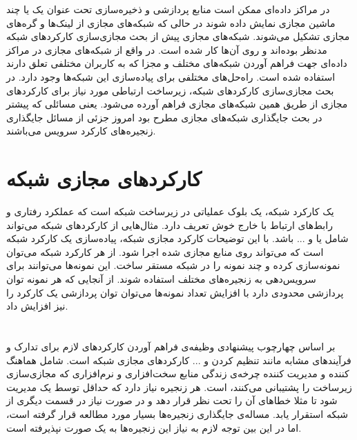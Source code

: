 در مراکز داده‌ای ممکن است منابع پردازشی و ذخیره‌سازی تحت عنوان یک یا چند
ماشین مجازی نمایش داده شوند در حالی که شبکه‌های مجازی از لینک‌ها و گره‌های مجازی تشکیل می‌شوند.
شبکه‌های مجازی پیش از بحث مجازی‌سازی کارکردهای شبکه مدنظر بوده‌اند و روی آن‌ها کار شده است.
در واقع از شبکه‌های مجازی در مراکز داده‌ای جهت فراهم آوردن شبکه‌های مختلف و مجزا که به کاربران مختلفی تعلق دارند
استفاده شده است. راه‌حل‌های مختلفی برای پیاده‌سازی این شبکه‌ها وجود دارد. در بحث مجازی‌سازی کارکردهای شبکه‌، زیرساخت ارتباطی
مورد نیاز 
برای کارکردهای مجازی از طریق همین شبکه‌های مجازی فراهم آورده می‌شود.
یعنی مسائلی که پیشتر در بحث جایگذاری شبکه‌های مجازی مطرح بود
امروز جزئی از مسائل جایگذاری زنجیره‌های کارکرد سرویس می‌باشند.

\section{کارکردهای مجازی شبکه}
یک کارکرد شبکه، یک بلوک عملیاتی در زیرساخت شبکه است که عملکرد رفتاری و رابط‌های ارتباط با خارج خوش تعریف دارد.
مثال‌هایی از کارکردهای شبکه می‌تواند شامل
یا
و ... باشد.
با این توضیحات کارکرد مجازی شبکه، پیاده‌سازی یک کارکرد شبکه است
که می‌تواند روی منابع مجازی شده اجرا شود.
از هر کارکرد شبکه می‌توان نمونه‌سازی کرده و چند نمونه را در شبکه مستقر ساخت. 
این نمونه‌ها می‌توانند برای سرویس‌دهی به زنجیره‌های مختلف استفاده شوند. از آنجایی که 
هر نمونه توان پردازشی محدودی دارد با افزایش تعداد نمونه‌ها می‌توان توان پردازشی یک کارکرد را نیز افزایش داد.

\section{}
بر اساس چهارچوب پیشنهادی 
وظیفه‌ی  فراهم آوردن کارکردهای لازم
برای تدارک و فرآیند‌های مشابه مانند تنظیم کردن و ... کارکردهای مجازی شبکه است.
 شامل هماهنگ کننده و مدیریت کننده چرخه‌ی زندگی
منابع سخت‌افزاری و نرم‌افزاری که مجازی‌سازی زیرساخت را پشتیبانی می‌کنند، است.
هر زنجیره نیاز دارد که حداقل توسط یک  مدیریت شود
تا مثلا خطاهای آن را تحت نظر قرار دهد و در صورت نیاز در قسمت دیگری از شبکه استقرار یابد.
مساله‌ی جایگذاری زنجیره‌ها بسیار مورد مطالعه قرار گرفته است، اما در این بین توجه لازم به نیاز این زنجیره‌ها به یک
صورت نپذیرفته است.